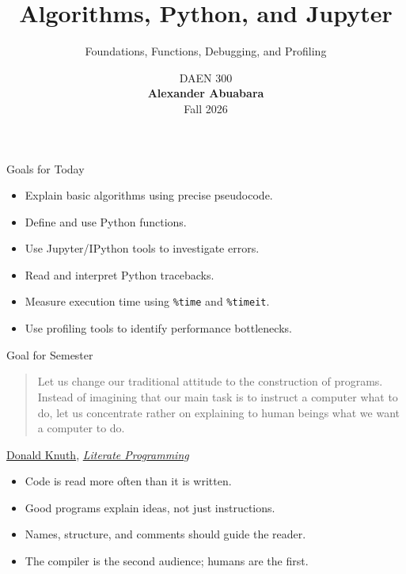 \documentclass[aspectratio=43,10pt]{beamer}
\title{Algorithms, Python, and Jupyter}
\subtitle{Foundations, Functions, Debugging, and Profiling}
\author{}
\date{%
  \textcolor{AggieMaroon}{
    DAEN 300\\
    \textbf{Alexander Abuabara}\\
    Fall 2026
  }
}
\begin{document}
\begin{frame}
  \titlepage
\end{frame}

\begin{frame}{Goals for Today}
\begin{itemize}
  \item Explain basic algorithms using precise pseudocode.
  \item Define and use Python functions.
  \item Use Jupyter/IPython tools to investigate errors.
  \item Read and interpret Python tracebacks.
  \item Measure execution time using \texttt{\%time} and \texttt{\%timeit}.
  \item Use profiling tools to identify performance bottlenecks.
\end{itemize}
\end{frame}

\begin{frame}{Goal for Semester}
\large

\begin{quote}
Let us change our traditional attitude to the construction of programs.
Instead of imagining that our main task is to instruct a computer what to do,
let us concentrate rather on explaining to human beings what we want a computer to do.
\end{quote}

\hfill 
\href{https://en.wikipedia.org/wiki/Donald_Knuth}{Donald Knuth}, 
\href{https://en.wikipedia.org/wiki/Literate_programming}{\emph{Literate Programming}}

\vspace{0.6cm}

\begin{itemize}
  \item Code is read more often than it is written.
  \item Good programs explain ideas, not just instructions.
  \item Names, structure, and comments should guide the reader.
  \item The compiler is the second audience; humans are the first.
\end{itemize}

\end{frame}
\end{document}
